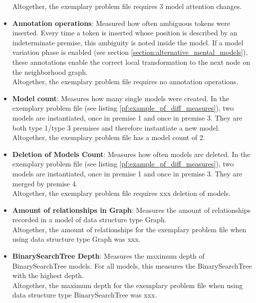 \documentclass[hidelinks]{scrartcl}
\begin{document}
\begin{itemize}
	Altogether, the exemplary problem file requires 3 model attention changes.
	\item \textbf{Annotation operations}: Measured how often ambiguous \gls{token}s were inserted. Every time a \gls{token} is inserted whose position is described by an indeterminate premise, this ambiguity is noted inside the model. If a model variation phase is enabled (see section \ref{section:alternative_mental_models}), these annotations enable the correct local transformation to the next node on the neighborhood graph. \\
	Altogether, the exemplary problem file requires no annotation operations.
	\item \textbf{Model count}: Measures how many single models were created. In the exemplary problem file (see listing \ref{pf:example_pf_diff_measures}), two models are instantiated, once in \gls{premise} 1 and once in \gls{premise} 3. They are both type 1/type 3 \gls{premise}s and therefore instantiate a new model. \\
	Altogether, the exemplary problem file has a model count of 2.
	\item \textbf{Deletion of Models Count}: Measures how often models are deleted. In the exemplary problem file (see listing \ref{pf:example_pf_diff_measures}), two models are instantiated, once in \gls{premise} 1 and once in \gls{premise} 3. They are merged by \gls{premise} 4. \\
	Altogether, the exemplary problem file requires xxx deletion of models.
	\item \textbf{Amount of relationships in Graph}: Measures the amount of relationships recorded in a model of data structure type Graph. \\
	Altogether, the amount of relationships for the exemplary problem file when using data structure type Graph was xxx.
	\item \textbf{BinarySearchTree Depth}: Measures the maximum depth of BinarySearchTree models. For all models, this measures the BinarySearchTree with the highest depth. \\
	Altogether, the maximum depth for the exemplary problem file when using data structure type BinarySearchTree was xxx.
\end{itemize}
\end{document}
